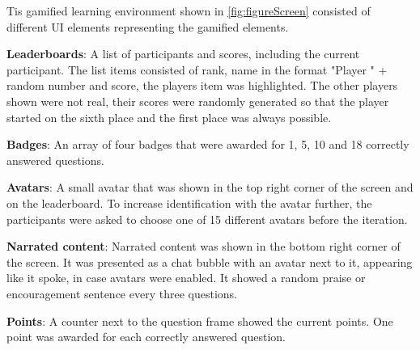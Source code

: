 Tis gamified learning environment shown in \autoref{fig:figureScreen} consisted of different UI elements representing the gamified elements.
\begin{APAitemize}
  \item \textbf{Leaderboards}: A list of participants and scores, including the current participant. The list items consisted of rank, name in the format "Player " + random number and score, the players item was highlighted. The other players shown were not real, their scores were randomly generated so that the player started on the sixth place and the first place was always possible.
  \item \textbf{Badges}: An array of four badges that were awarded for 1, 5, 10 and 18 correctly answered questions.
  \item \textbf{Avatars}: A small avatar that was shown in the top right corner of the screen and on the leaderboard. To increase identification with the avatar further, the participants were asked to choose one of 15 different avatars before the iteration.
  \item \textbf{Narrated content}: Narrated content was shown in the bottom right corner of the screen. It was presented as a chat bubble with an avatar next to it, appearing like it spoke, in case avatars were enabled. It showed a random praise or encouragement sentence every three questions.
  \item \textbf{Points}: A counter next to the question frame showed the current points. One point was awarded for each correctly answered question.
\end{APAitemize}

